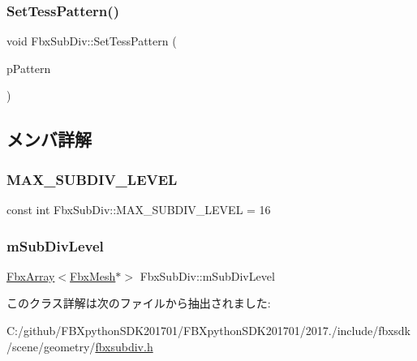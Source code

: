\mbox{\label{class_fbx_sub_div_ab9489633777763369cc14a617d567488}} 
\subsubsection{\texorpdfstring{Set\+Tess\+Pattern()}{SetTessPattern()}}
{\footnotesize\ttfamily void Fbx\+Sub\+Div\+::\+Set\+Tess\+Pattern (\begin{DoxyParamCaption}\item[{\hyperlink{class_fbx_sub_div_a06cb3da0d9b384dc83585caa49f46684}{Fbx\+Sub\+Div\+::\+E\+Tesselation\+Pattern}}]{p\+Pattern }\end{DoxyParamCaption})}



\subsection{メンバ詳解}
\mbox{\label{class_fbx_sub_div_aa98ca1fbe21bbb387a56fe893d902a1e}} 
\subsubsection{\texorpdfstring{M\+A\+X\+\_\+\+S\+U\+B\+D\+I\+V\+\_\+\+L\+E\+V\+EL}{MAX\_SUBDIV\_LEVEL}}
{\footnotesize\ttfamily const int Fbx\+Sub\+Div\+::\+M\+A\+X\+\_\+\+S\+U\+B\+D\+I\+V\+\_\+\+L\+E\+V\+EL = 16\hspace{0.3cm}{\ttfamily [static]}}

\mbox{\label{class_fbx_sub_div_a4f4f0ffea9a17d4dc31ad9dcac3e89eb}} 
\subsubsection{\texorpdfstring{m\+Sub\+Div\+Level}{mSubDivLevel}}
{\footnotesize\ttfamily \hyperlink{class_fbx_array}{Fbx\+Array}$<$\hyperlink{class_fbx_mesh}{Fbx\+Mesh}$\ast$$>$ Fbx\+Sub\+Div\+::m\+Sub\+Div\+Level}



このクラス詳解は次のファイルから抽出されました\+:\begin{DoxyCompactItemize}
\item 
C\+:/github/\+F\+B\+Xpython\+S\+D\+K201701/\+F\+B\+Xpython\+S\+D\+K201701/2017./include/fbxsdk/scene/geometry/\hyperlink{fbxsubdiv_8h}{fbxsubdiv.\+h}\end{DoxyCompactItemize}
